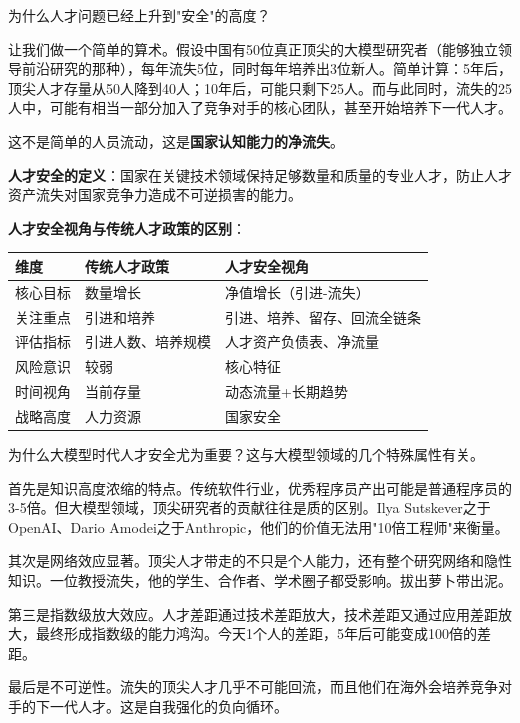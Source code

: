 为什么人才问题已经上升到"安全"的高度？

让我们做一个简单的算术。假设中国有50位真正顶尖的大模型研究者（能够独立领导前沿研究的那种），每年流失5位，同时每年培养出3位新人。简单计算：5年后，顶尖人才存量从50人降到40人；10年后，可能只剩下25人。而与此同时，流失的25人中，可能有相当一部分加入了竞争对手的核心团队，甚至开始培养下一代人才。

这不是简单的人员流动，这是\textbf{国家认知能力的净流失}。

\textbf{人才安全的定义}：国家在关键技术领域保持足够数量和质量的专业人才，防止人才资产流失对国家竞争力造成不可逆损害的能力。

\textbf{人才安全视角与传统人才政策的区别}：

\begin{center}
\small
\begin{tabular}{|p{3cm}|p{5cm}|p{5cm}|}
\hline
\textbf{维度} & \textbf{传统人才政策} & \textbf{人才安全视角} \\
\hline
核心目标 & 数量增长 & 净值增长（引进-流失） \\
\hline
关注重点 & 引进和培养 & 引进、培养、留存、回流全链条 \\
\hline
评估指标 & 引进人数、培养规模 & 人才资产负债表、净流量 \\
\hline
风险意识 & 较弱 & 核心特征 \\
\hline
时间视角 & 当前存量 & 动态流量+长期趋势 \\
\hline
战略高度 & 人力资源 & 国家安全 \\
\hline
\end{tabular}
\end{center}

为什么大模型时代人才安全尤为重要？这与大模型领域的几个特殊属性有关。

首先是知识高度浓缩的特点。传统软件行业，优秀程序员产出可能是普通程序员的3-5倍。但大模型领域，顶尖研究者的贡献往往是质的区别。Ilya Sutskever之于OpenAI、Dario Amodei之于Anthropic，他们的价值无法用"10倍工程师"来衡量。

其次是网络效应显著。顶尖人才带走的不只是个人能力，还有整个研究网络和隐性知识。一位教授流失，他的学生、合作者、学术圈子都受影响。拔出萝卜带出泥。

第三是指数级放大效应。人才差距通过技术差距放大，技术差距又通过应用差距放大，最终形成指数级的能力鸿沟。今天1个人的差距，5年后可能变成100倍的差距。

最后是不可逆性。流失的顶尖人才几乎不可能回流，而且他们在海外会培养竞争对手的下一代人才。这是自我强化的负向循环。

